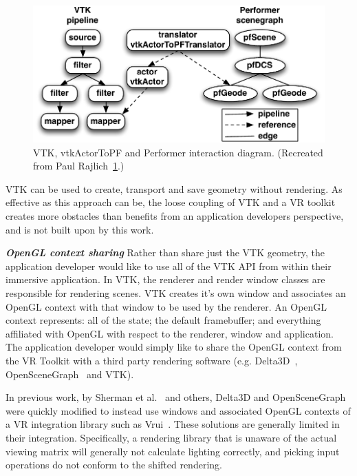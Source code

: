 \begin{figure}[h!]
  \centering
  \includegraphics[width=\linewidth]{images/vtkActorToPF.pdf}
  \caption{VTK, vtkActorToPF and Performer interaction diagram. (Recreated from Paul Rajlich~\ref{fig:vtkActorToPF}.)}
  \label{fig:vtkActorToPF}
\end{figure}

VTK can be used to create, transport and save geometry without rendering. As effective as this approach can be, the loose coupling of VTK and a VR toolkit creates more obstacles than benefits from an application developers perspective, and is not built upon by this work.

\textbf{\textit{OpenGL context sharing}} Rather than share just the VTK geometry, the application developer would like to use all of the VTK API from within their immersive application.
In VTK, the renderer and render window classes are responsible for rendering scenes.
VTK creates it's own window and associates an OpenGL context with that window to be used by the renderer.
An OpenGL context represents: all of the state; the default framebuffer; and everything affiliated with OpenGL with respect to the renderer, window and application.
The application developer would simply like to share the OpenGL context from the VR Toolkit with a third party rendering software (e.g. Delta3D~\cite{McDowell:2006}, OpenSceneGraph~\cite{Wang:2010} and VTK). 

In previous work, by Sherman et al.~\cite{Sherman:2010} and others, Delta3D
and OpenSceneGraph were quickly modified to instead use windows and associated
OpenGL contexts of a VR integration library such as Vrui~\cite{Kreylos:2006}.
These solutions are generally limited in their integration.
Specifically, a rendering library that is unaware of the actual
viewing matrix will generally not calculate lighting correctly, and
picking input operations do not conform to the shifted rendering.

